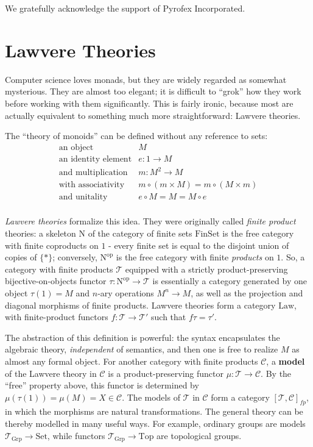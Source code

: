 \documentclass[a4paper,UKenglish]{article}
\theoremstyle{definition}
\newcommand{\Set}{\mathrm{Set}}
\newcommand{\Grp}{\mathrm{Grp}}
\newcommand{\Law}{\mathrm{Law}}
\newcommand{\Top}{\mathrm{Top}}
\newcommand{\FinSet}{\mathrm{FinSet}}
\newcommand{\op}{\mathrm{op}}
\newcommand{\NN}{\mathrm{N}}
\newcommand{\C}{\mathscr{C}}
\newcommand{\T}{\mathscr{T}}
\begin{document}
We gratefully acknowledge the support of Pyrofex Incorporated.

\section{Lawvere Theories}
Computer science loves monads, but they are widely regarded as somewhat mysterious. They are almost too elegant; it is difficult to ``grok'' how they work before working with them significantly. This is fairly ironic, because most are actually equivalent to something much more straightforward: Lawvere theories.

The ``theory of monoids'' can be defined without any reference to sets:
\[\begin{array}{rl}
\text{an object} & M\\
\text{an identity element} & e:1 \to M\\
\text{and multiplication} & m: M^2 \to M\\
\text{with associativity} & m \circ (m \times M) = m \circ (M \times m)\\
\text{and unitality} & e \circ M = M = M \circ e\\
\end{array}\]

\textit{Lawvere theories} formalize this idea. They were originally called \textit{finite product} theories: a skeleton $\NN$ of the category of finite sets $\FinSet$ is the free category with finite coproducts on $1$ - every finite set is equal to the disjoint union of copies of $\{*\}$; conversely, $\NN^\op$ is the free category with finite \textit{products} on $1$. So, a category with finite products $\T$ equipped with a strictly product-preserving bijective-on-objects functor $\tau:\NN^\op \to \T$ is essentially a category generated by one object $\tau(1) = M$ and $n$-ary operations $M^n \to M$, as well as the projection and diagonal morphisms of finite products. Lawvere theories form a category $\Law$, with finite-product functors $f: \T\to \T'$ such that $f\tau = \tau'$.

The abstraction of this definition is powerful: the syntax encapsulates the algebraic theory, \textit{independent} of semantics, and then one is free to realize $M$ as almost any formal object. For another category with finite products $\C$, a \textbf{model} of the Lawvere theory in $\C$ is a product-preserving functor $\mu: \T \to \C$. By the ``free'' property above, this functor is determined by $\mu(\tau(1)) = \mu(M) = X \in \C$. The models of $\T$ in $\C$ form a category $[\T,\C]_{fp}$, in which the morphisms are natural transformations. The general theory can be thereby modelled in many useful ways. For example, ordinary groups are models $\T_\Grp \to \Set$, while functors $\T_\Grp \to \Top$ are topological groups.
\end{document}
